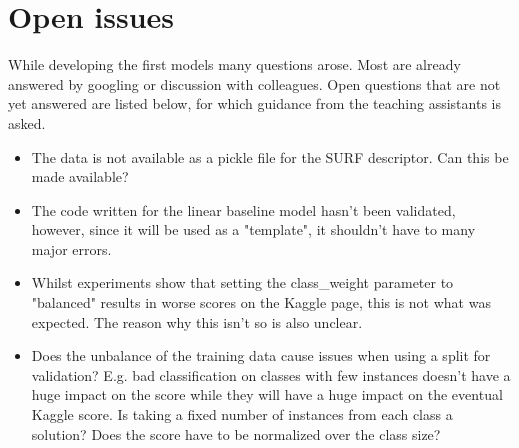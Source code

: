 
\section{Open issues}
\label{section:open_issues}

While developing the first models many questions arose. Most are already answered by googling or discussion with colleagues. Open questions that are not yet answered are listed below, for which guidance from the teaching assistants is asked.

\begin{itemize}
    \item The data is not available as a pickle file for the SURF descriptor. Can this be made available?
    \item The code written for the linear baseline model hasn't been validated, however, since it will be used as a "template", it shouldn't have to many major errors.
    \item Whilst experiments show that setting the class\_weight parameter to "balanced" results in worse scores on the Kaggle page, this is not what was expected. The reason why this isn't so is also unclear.
    \item Does the unbalance of the training data cause issues when using a split for validation? E.g. bad classification on classes with few instances doesn't have a huge impact on the score while they will have a huge impact on the eventual Kaggle score. Is taking a fixed number of instances from each class a solution? Does the score have to be normalized over the class size?
\end{itemize}